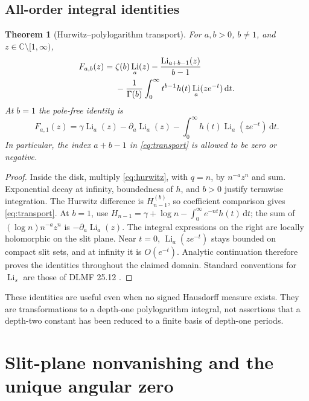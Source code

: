 \documentclass[11pt]{article}
\numberwithin{equation}{section}
\newtheorem{theorem}{Theorem}[section]
\theoremstyle{definition}\newtheorem{definition}[theorem]{Definition}
\theoremstyle{remark}\newtheorem{remark}[theorem]{Remark}
\newcommand{\dd}{\,\mathrm d}
\newcommand{\C}{\mathbb C}
\DeclareMathOperator{\Li}{Li}
\newcommand{\cut}{\C\setminus[1,\infty)}
\begin{document}
\subsection{All-order integral identities}
\begin{theorem}[Hurwitz--polylogarithm transport]\label{thm:transport}
For $a,b>0$, $b\ne1$, and $z\in\cut$,
\begin{align}\label{eq:transport}
 F_{a,b}(z)={}&\zeta(b)\Li_a(z)-\frac{\Li_{a+b-1}(z)}{b-1}\notag\\
 &-\frac1{\Gamma(b)}\int_0^\infty t^{b-1}h(t)\Li_a(ze^{-t})\dd t.
\end{align}
At $b=1$ the pole-free identity is
\begin{equation}\label{eq:transport1}
 F_{a,1}(z)=\gamma\Li_a(z)-\partial_a\Li_a(z)
       -\int_0^\infty h(t)\Li_a(ze^{-t})\dd t.
\end{equation}
In particular, the index $a+b-1$ in \eqref{eq:transport} is allowed
to be zero or negative.
\end{theorem}
\begin{proof}
Inside the disk, multiply \eqref{eq:hurwitz}, with $q=n$, by
$n^{-a}z^n$ and sum. Exponential decay at infinity, boundedness of
$h$, and $b>0$ justify termwise integration. The Hurwitz difference
is $H_{n-1}^{(b)}$, so coefficient comparison gives
\eqref{eq:transport}. At $b=1$, use
$H_{n-1}=\gamma+\log n-\int_0^\infty e^{-nt}h(t)\dd t$;
the sum of $(\log n)n^{-a}z^n$ is $-\partial_a\Li_a(z)$.
The integral expressions on the right are locally holomorphic on the
slit plane. Near $t=0$, $\Li_a(ze^{-t})$ stays bounded on compact
slit sets, and at infinity it is $O(e^{-t})$. Analytic continuation
therefore proves the identities throughout the claimed domain.
Standard conventions for $\Li_s$ are those of DLMF 25.12
\cite{dlmf-polylog}.
\end{proof}

These identities are useful even when no signed Hausdorff measure
exists. They are transformations to a depth-one polylogarithm integral,
not assertions that a depth-two constant has been reduced to a finite
basis of depth-one periods.

\section{Slit-plane nonvanishing and the unique angular zero}
\label{sec:zeros}
\end{document}
